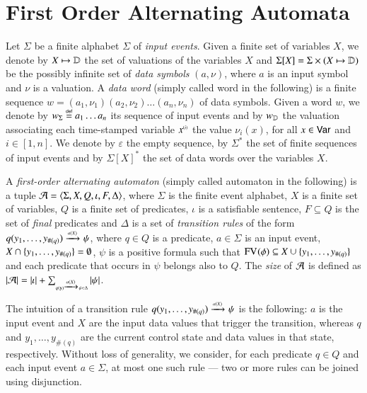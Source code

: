 \documentclass{llncs}
\begin{document}
\section{First Order Alternating Automata}

Let $\Sigma$ be a finite alphabet $\Sigma$ of \emph{input
  events}. Given a finite set of variables $X$, we denote by $X
\mapsto \mathbb{D}$ the set of valuations of the variables $X$ and
$\Sigma[X] = \Sigma \times (X \mapsto \mathbb{D})$ be the possibly infinite
set of \emph{data symbols} $(a,\nu)$, where $a$ is an input symbol and
$\nu$ is a valuation. A \emph{data word} (simply called word in the
following) is a finite sequence $w=(a_1,\nu_1)(a_2,\nu_2) \ldots
(a_n,\nu_n)$ of data symbols. Given a word $w$, we denote by
${w}_\Sigma \stackrel{\scriptscriptstyle{\mathsf{def}}}{=} a_1\ldots a_n$ its sequence of input events and by
${w}_{\mathbb{D}}$ the valuation associating each time-stamped variable
${x}^{\scriptscriptstyle{({i})}}$ the value $\nu_i(x)$, for all $x \in \mathsf{Var}$ and
$i\in[1,n]$. We denote by $\varepsilon$ the empty sequence, by
$\Sigma^*$ the set of finite sequences of input events and by
$\Sigma[X]^*$ the set of data words over the variables $X$.

A \emph{first-order alternating automaton} (simply called automaton in
the following) is a tuple $\mathcal{A} = \langle \Sigma,X,Q,\iota,F,\Delta \rangle$,
where $\Sigma$ is the finite event alphabet, $X$ is a finite set of
variables, $Q$ is a finite set of predicates, $\iota$ is a satisfiable
sentence, $F \subseteq Q$ is the set of \emph{final} predicates and
$\Delta$ is a set of \emph{transition rules} of the form
\(q(y_1,\ldots,y_{\#(q)}) \xrightarrow{{\scriptscriptstyle a(X)}}_{{\scriptstyle }} \psi\), where $q \in Q$ is a
predicate, $a \in \Sigma$ is an input event, $X \cap
\{ y_1,\ldots,y_{\#(q)} \} = \emptyset$, $\psi$ is a positive formula
such that $\mathrm{FV}_{}(\phi) \subseteq X \cup \{ y_1,\ldots,y_{\#(q)} \}$
and each predicate that occurs in $\psi$ belongs also to $Q$. The
\emph{size} of $\mathcal{A}$ is defined as ${|{\mathcal{A}}|} = {|{\iota}|} +
\sum_{\scriptscriptstyle{q(\mathbf y) \xrightarrow{{\scriptscriptstyle a(X)}}_{{\scriptstyle }} \psi \in \Delta}}
{|{\psi}|}$.

The intuition of a transition rule \(q(y_1,\ldots,y_{\#(q)})
\xrightarrow{{\scriptscriptstyle a(X)}}_{{\scriptstyle }} \psi\) is the following: $a$ is the input event and $X$
are the input data values that trigger the transition, whereas $q$ and
$y_1,\ldots,y_{\#(q)}$ are the current control state and data values
in that state, respectively. Without loss of generality, we consider,
for each predicate $q \in Q$ and each input event $a \in \Sigma$, at
most one such rule --- two or more rules can be joined using
disjunction. 
\end{document}
